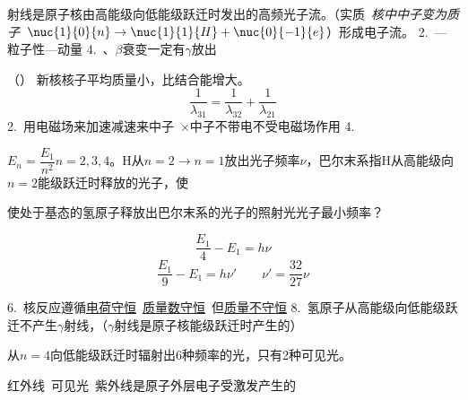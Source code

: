 \unclear{$\gamma$}射线是原子核由高能级向低能级跃迁时发出的高频光子流。（实质\ \textit{核中中子变为质子}\ $\nuc{1}{0}{n}\to\nuc{1}{1}{H}+\nuc{0}{-1}{e}$）形成电子流。 %
2.\ —粒子性—动量
4.\ \unclear{$\alpha$}、$\beta$衰变一定有$\gamma$放出

{\small （）} %
新核核子平均质量小，比结合能增大。
\[
\frac{1}{\lambda_{31}}=\frac{1}{\lambda_{32}}+\frac{1}{\lambda_{21}}
\]
2.\ 用电磁场来加速减速来中子\ $\times$\qquad 中子不带电不受电磁场作用 %
4.
\begin{problem}
$E_n=\dfrac{E_1}{n^2}$\quad $n=2,3,4$。H从$n=2\to n=1$放出光子频率$\nu$，巴尔末系指H从高能级向$n=2$能级跃迁时释放的光子，使

使处于基态的氢原子释放出巴尔末系的光子的照射光光子最小频率？ %
\begin{solution}
\[
\frac{E_1}{4}-E_1=h\nu
\]
\[
\frac{E_1}{9}-E_1=h\nu'\qquad \nu'=\frac{32}{27}\nu
\]
\end{solution}
\end{problem}
6.\ 核反应遵循\underline{电荷守恒}\ \underline{质量数守恒}\ 但\underline{质量不守恒}
8.\ 氢原子从高能级向低能级跃迁不产生$\gamma$射线，（$\gamma$射线是原子核能级跃迁时产生的）

\hspace{1.5em}从$n=4$向低能级跃迁时辐射出6种频率的光，只有2种可见光。

\hspace{1.5em}红外线\ 可见光\ 紫外线是原子外层电子受激发产生的

